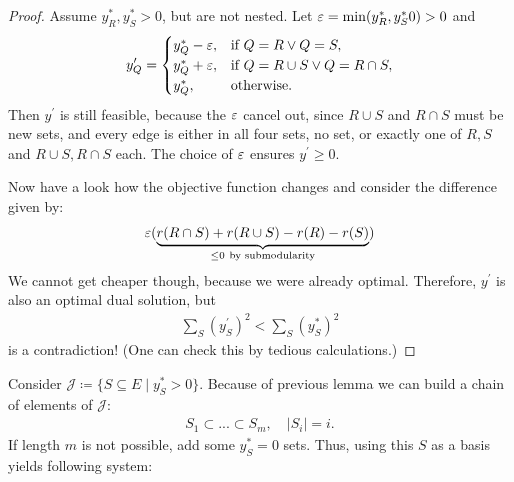 \begin{proof}
    Assume $y_R^*, y_S^* > 0$, but are not nested.
    Let $\varepsilon = \min(y_R^*,y_S^*0) >0$ and
    \begin{align*}
        y_Q^\prime = \begin{cases}
                         y_Q^*- \varepsilon, & \text{if } Q= R \vee Q=S,               \\
                         y_Q^*+ \varepsilon, & \text{if } Q= R \cup S \vee Q=R \cap S, \\
                         y_Q^*,       & \text{otherwise}.                      \\
                     \end{cases}
    \end{align*}
    Then $y^\prime$ is still feasible, because the $\varepsilon$ cancel out, since $R \cup S$ and $R \cap S$ must be new sets,
    and every edge is either in all four sets, no set, or exactly one of $R,S$ and $R\cup S,R\cap S$ each.
    The choice of $\varepsilon$ ensures $y^\prime \geq 0$.

    Now have a look how the objective function changes and consider the difference given by:
    \begin{align*}
        \varepsilon (\underbrace{r(R \cap S) + r(R \cup S) - r(R) - r(S)}_{\leq 0\ \text{by submodularity}})
    \end{align*}
    We cannot get cheaper though, because we were already optimal. Therefore,  $y^\prime$ is also an optimal dual solution, but
    \begin{align*}
        \sum_S(y_S^\prime)^2 < \sum_S(y^*_S)^2
    \end{align*}
    is a contradiction! (One can check this by tedious calculations.)
\end{proof}
Consider $\mathcal{J} \coloneqq \{S \subseteq E \mid y_S^* > 0\}$.
Because of previous lemma we can build a chain of elements of $\mathcal J$:
\begin{align*}
    S_1 \subset ... \subset S_m, \quad |S_i|=i.
\end{align*}
If length $m$ is not possible, add some $y^*_S=0$ sets.
Thus, using this $S$ as a basis yields following system:
